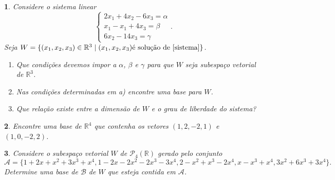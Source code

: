 \documentclass[12pt]{exam}
\newtheorem{exercicio}{}
\newcommand{\real}{\mathbb{R}}
\begin{document}
\begin{exercicio}
  Considere o sistema linear
  \begin{equation}\label{sistema}
    \begin{cases}
      2x_1 + 4x_2 - 6x_3 = \alpha\\
      x_1 - x_1 + 4x_3 = \beta\\
      6x_2 - 14x_3 = \gamma
    \end{cases}.
  \end{equation}
  Seja $W = \{(x_1, x_2, x_3) \in \real^3 \mid (x_1, x_2, x_3) \mbox{\'e solu\c{c}\~ao de } \eqref{sistema}\}$.
  \begin{enumerate}[label={\alph*})]
    \item Que condi\c{c}\~oes devemos impor a $\alpha$, $\beta$ e $\gamma$ para que $W$ seja subespa\c{c}o vetorial de $\real^3$.
    \item Nas condi\c{c}\~oes determinadas em \textit{a)} encontre uma base para $W$.
    \item Que rela\c{c}\~ao existe entre a dimens\~ao de $W$ e o grau de liberdade do sistema?
  \end{enumerate}
\end{exercicio}

\begin{exercicio}
  Encontre uma base de $\real^4$ que contenha os vetores $(1,2,-2,1)$ e $(1,0,-2,2)$.
\end{exercicio}

\begin{exercicio}
  Considere o subespa\c{c}o vetorial $W$ de $\mathcal{P}_4(\real)$ gerado pelo conjunto
  \[
    \mathcal{A} = \{1+2x+x^2+3x^3+x^4, 1-2x-2x^2-2x^3-3x^4,2-x^2+x^3-2x^4,x-x^3+x^4,3x^2+6x^3+3x^4\}.
  \]
  Determine uma base de $\mathcal{B}$ de $W$ que esteja contida em $\mathcal{A}$.
\end{exercicio}
\end{document}
